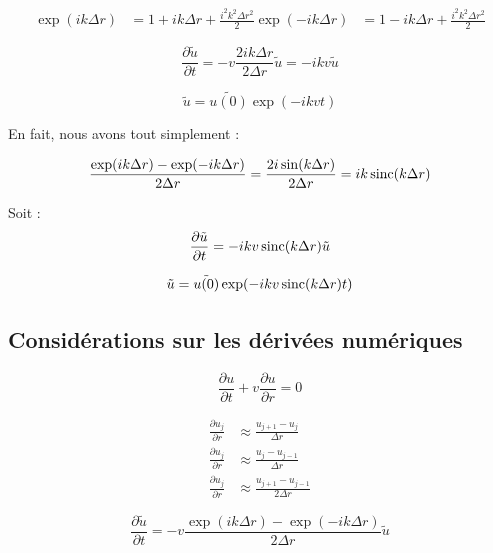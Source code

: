 \begin{align}
    \exp(ik\Delta{r}) &= 1 + ik\Delta{r} + \frac{i^2 k^2 \Delta{r}^2}{2}
    \exp(-ik\Delta{r}) &= 1 - ik\Delta{r} + \frac{i^2 k^2 \Delta{r}^2}{2}
\end{align}

\begin{equation}
    \frac{\partial \tilde{u}}{\partial t} = - v \frac{2ik\Delta{r}}{2\Delta{r}} \tilde{u} = - i k v \tilde{u}
\end{equation}

\begin{equation}
    \tilde{u} = \tilde{u(0)} \exp(-i k v t)
\end{equation}

En fait, nous avons tout simplement :

\begin{equation}
    \frac{\exp(ik\Delta{r}) - \exp(-ik\Delta{r})}{2 \Delta{r}} = \frac{2 i \sin(k\Delta{r})}{2 \Delta{r}} = i k \operatorname{sinc}(k\Delta{r})
\end{equation}

Soit :
\begin{equation}
    \frac{\partial \tilde{u}}{\partial t} = - i k v \operatorname{sinc}(k\Delta{r}) \tilde{u}
\end{equation}

\begin{equation}
    \tilde{u} = \tilde{u(0)} \exp(-i k v \operatorname{sinc}(k \Delta{r}) t)
\end{equation}

\subsection{Considérations sur les dérivées numériques}

\begin{equation}
    \frac{\partial u}{\partial t} + v \frac{\partial u}{\partial r} = 0
\end{equation}

\begin{align}
    \frac{\partial u_j}{\partial r} &\approx \frac{u_{j+1} - u_j}{\Delta{r}} \\
    \frac{\partial u_j}{\partial r} &\approx \frac{u_j - u_{j-1}}{\Delta{r}} \\
    \frac{\partial u_j}{\partial r} &\approx \frac{u_{j+1} - u_{j-1}}{2 \Delta{r}}
\end{align}

\begin{equation}
    \frac{\partial \tilde{u}}{\partial t} = - v \frac{\exp(ik\Delta{r}) - \exp(-ik\Delta{r})}{2 \Delta{r}} \tilde{u}
\end{equation}

